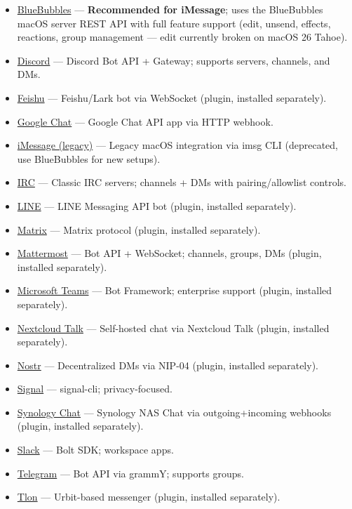 \begin{itemize}
  \item \href{/channels/bluebubbles}{BlueBubbles} — \textbf{Recommended for iMessage}; uses the BlueBubbles macOS server REST API with full feature support (edit, unsend, effects, reactions, group management — edit currently broken on macOS 26 Tahoe).
  \item \href{/channels/discord}{Discord} — Discord Bot API + Gateway; supports servers, channels, and DMs.
  \item \href{/channels/feishu}{Feishu} — Feishu/Lark bot via WebSocket (plugin, installed separately).
  \item \href{/channels/googlechat}{Google Chat} — Google Chat API app via HTTP webhook.
  \item \href{/channels/imessage}{iMessage (legacy)} — Legacy macOS integration via imsg CLI (deprecated, use BlueBubbles for new setups).
  \item \href{/channels/irc}{IRC} — Classic IRC servers; channels + DMs with pairing/allowlist controls.
  \item \href{/channels/line}{LINE} — LINE Messaging API bot (plugin, installed separately).
  \item \href{/channels/matrix}{Matrix} — Matrix protocol (plugin, installed separately).
  \item \href{/channels/mattermost}{Mattermost} — Bot API + WebSocket; channels, groups, DMs (plugin, installed separately).
  \item \href{/channels/msteams}{Microsoft Teams} — Bot Framework; enterprise support (plugin, installed separately).
  \item \href{/channels/nextcloud-talk}{Nextcloud Talk} — Self-hosted chat via Nextcloud Talk (plugin, installed separately).
  \item \href{/channels/nostr}{Nostr} — Decentralized DMs via NIP-04 (plugin, installed separately).
  \item \href{/channels/signal}{Signal} — signal-cli; privacy-focused.
  \item \href{/channels/synology-chat}{Synology Chat} — Synology NAS Chat via outgoing+incoming webhooks (plugin, installed separately).
  \item \href{/channels/slack}{Slack} — Bolt SDK; workspace apps.
  \item \href{/channels/telegram}{Telegram} — Bot API via grammY; supports groups.
  \item \href{/channels/tlon}{Tlon} — Urbit-based messenger (plugin, installed separately).

\end{itemize}
